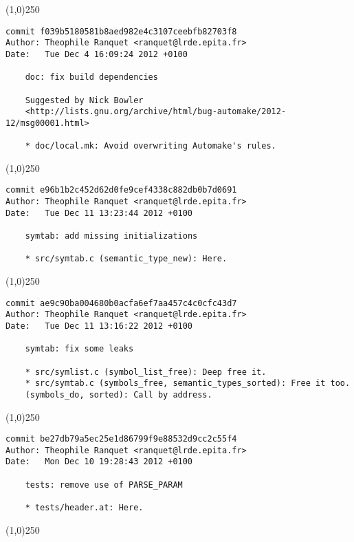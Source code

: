 \line(1,0){250}
\begin{verbatim}
commit f039b5180581b8aed982e4c3107ceebfb82703f8
Author: Theophile Ranquet <ranquet@lrde.epita.fr>
Date:   Tue Dec 4 16:09:24 2012 +0100

    doc: fix build dependencies
    
    Suggested by Nick Bowler
    <http://lists.gnu.org/archive/html/bug-automake/2012-12/msg00001.html>
    
    * doc/local.mk: Avoid overwriting Automake's rules.

\end{verbatim}
\line(1,0){250}
\begin{verbatim}
commit e96b1b2c452d62d0fe9cef4338c882db0b7d0691
Author: Theophile Ranquet <ranquet@lrde.epita.fr>
Date:   Tue Dec 11 13:23:44 2012 +0100

    symtab: add missing initializations
    
    * src/symtab.c (semantic_type_new): Here.

\end{verbatim}
\line(1,0){250}
\begin{verbatim}
commit ae9c90ba004680b0acfa6ef7aa457c4c0cfc43d7
Author: Theophile Ranquet <ranquet@lrde.epita.fr>
Date:   Tue Dec 11 13:16:22 2012 +0100

    symtab: fix some leaks
    
    * src/symlist.c (symbol_list_free): Deep free it.
    * src/symtab.c (symbols_free, semantic_types_sorted): Free it too.
    (symbols_do, sorted): Call by address.

\end{verbatim}
\line(1,0){250}
\begin{verbatim}
commit be27db79a5ec25e1d86799f9e88532d9cc2c55f4
Author: Theophile Ranquet <ranquet@lrde.epita.fr>
Date:   Mon Dec 10 19:28:43 2012 +0100

    tests: remove use of PARSE_PARAM
    
    * tests/header.at: Here.

\end{verbatim}
\line(1,0){250}

